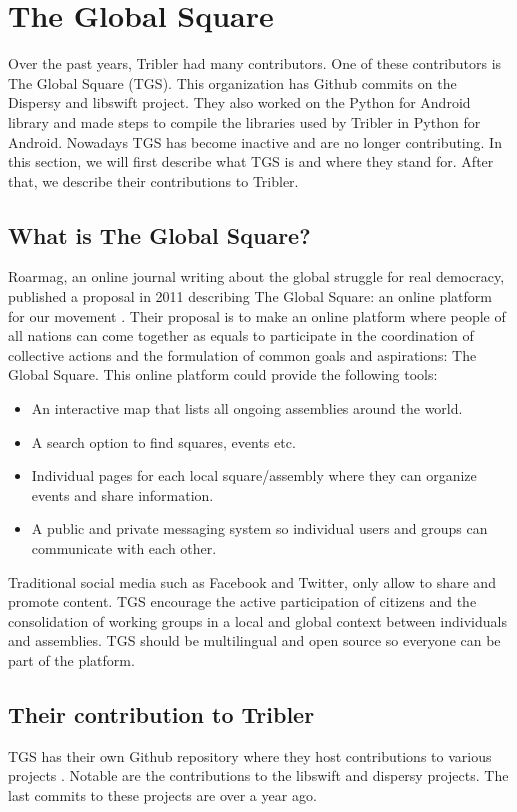 \section{The Global Square}
	\label{scc:tgs}
	Over the past years, Tribler had many contributors. One of these contributors is The Global Square (TGS). This organization has Github commits on the Dispersy and libswift project. They also worked on the Python for Android library and made steps to compile the libraries used by Tribler in Python for Android. Nowadays TGS has become inactive and are no longer contributing. In this section, we will first describe what TGS is and where they stand for. After that, we describe their contributions to Tribler.

	\subsection{What is The Global Square?}
		Roarmag, an online journal writing about the global struggle for real democracy, published a proposal in 2011 describing The Global Square: an online platform for our movement \cite{theglobalsquare}. Their proposal is to make an online platform where people of all nations can come together as equals to participate in the coordination of collective actions and the formulation of common goals and aspirations: The Global Square. This online platform could provide the following tools:
		\begin{itemize}
			\item An interactive map that lists all ongoing assemblies around the world.
			\item A search option to find squares, events etc.
			\item Individual pages for each local square/assembly where they can organize events and share information.
			\item A public and private messaging system so individual users and groups can communicate with each other.
		\end{itemize}
		Traditional social media such as Facebook and Twitter, only allow to share and promote content. TGS encourage the active participation of citizens and the consolidation of working groups in a local and global context between individuals and assemblies. TGS should be multilingual and open source so everyone can be part of the platform.
	
	\subsection{Their contribution to Tribler}
		TGS has their own Github repository where they host contributions to various projects \cite{theglobalsquaregithub}. Notable are the contributions to the libswift and dispersy projects. The last commits to these projects are over a year ago.
		
